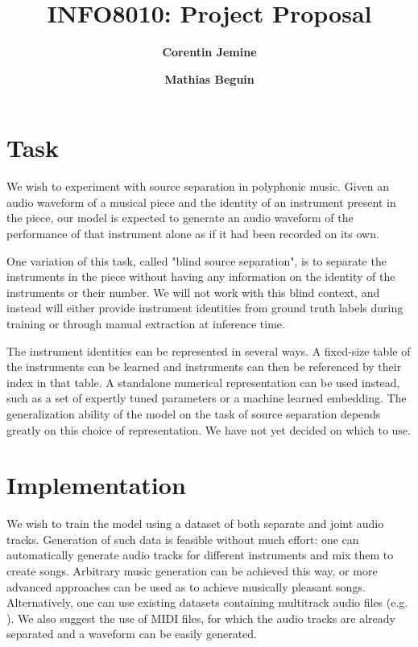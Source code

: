 \documentclass[twocolumn,superscriptaddress,aps]{revtex4-1}
\begin{document}

\title{\Large{INFO8010: Project Proposal}}
\vspace{1cm}
\author{\small{\bf Corentin Jemine}}
\author{\small{\bf Mathias Beguin}}

\maketitle


\section{Task}
We wish to experiment with source separation in polyphonic music. Given an audio waveform of a musical piece and the identity of an instrument present in the piece, our model is expected to generate an audio waveform of the performance of that instrument alone as if it had been recorded on its own. 

One variation of this task, called "blind source separation", is to separate the instruments in the piece without having any information on the identity of the instruments or their number. We will not work with this blind context, and instead will either provide instrument identities from ground truth labels during training or through manual extraction at inference time.

The instrument identities can be represented in several ways. A fixed-size table of the instruments can be learned and instruments can then be referenced by their index in that table. A standalone numerical representation can be used instead, such as a set of expertly tuned parameters or a machine learned embedding. The generalization ability of the model on the task of source separation depends greatly on this choice of representation. We have not yet decided on which to use.

\section{Implementation}
We wish to train the model using a dataset of both separate and joint audio tracks. Generation of such data is feasible without much effort: one can automatically generate audio tracks for different instruments and mix them to create songs. Arbitrary music generation can be achieved this way, or more advanced approaches can be used as to achieve musically pleasant songs. Alternatively, one can use existing datasets containing multitrack audio files (e.g. \cite{MedleyDB}). We also suggest the use of MIDI files, for which the audio tracks are already separated and a waveform can be easily generated.
\end{document}
